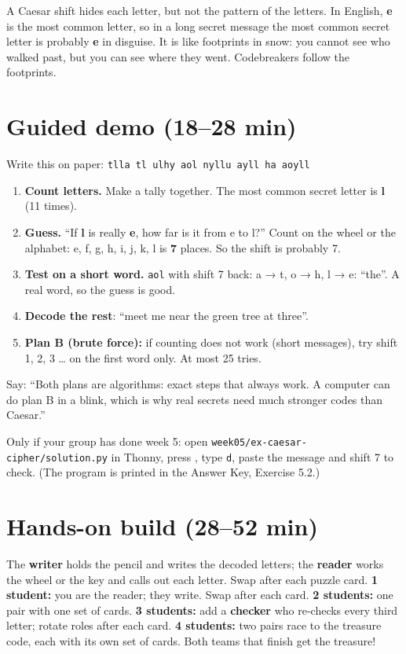 \begin{analogy}
A Caesar shift hides each letter, but not the pattern of the letters. In English, \textbf{e} is the most common letter, so in a long secret message
the most common secret letter is probably \textbf{e} in disguise. It is like footprints in snow: you cannot see who walked past,
but you can see where they went. Codebreakers follow the footprints.
\end{analogy}

\section{Guided demo (18--28 min)}
\begin{workedexample}
Write this on paper: \texttt{tlla tl ulhy aol nyllu ayll ha aoyll}
\begin{enumerate}[leftmargin=1.4em]
  \item \textbf{Count letters.} Make a tally together. The most common secret letter is \textbf{l} (11 times).
  \item \textbf{Guess.} \enquote{If \textbf{l} is really \textbf{e}, how far is it from e to l?} Count on the wheel or the alphabet: e, f, g, h, i, j, k, l is \textbf{7} places. So the shift is probably 7.
  \item \textbf{Test on a short word.} \texttt{aol} with shift 7 back: a → t, o → h, l → e: \enquote{the}. A real word, so the guess is good.
  \item \textbf{Decode the rest}: \enquote{meet me near the green tree at three}.
  \item \textbf{Plan B (brute force):} if counting does not work (short messages), try shift 1, 2, 3 \ldots{} on the first word only. At most 25 tries.
\end{enumerate}
Say: \enquote{Both plans are algorithms: exact steps that always work. A computer can do plan B in a blink, which is why real secrets need much stronger codes than Caesar.}
\end{workedexample}
Only if your group has done week 5: open \texttt{week05/ex-caesar-cipher/solution.py} in Thonny, press , type \texttt{d}, paste the message
and shift 7 to check. (The program is printed in the Answer Key, Exercise 5.2.)

\section{Hands-on build (28--52 min)}
\begin{pairroles}
The \textbf{writer} holds the pencil and writes the decoded letters; the \textbf{reader} works the wheel or the key and calls out each letter.
Swap after each puzzle card.
\textbf{1 student:} you are the reader; they write. Swap after each card.
\textbf{2 students:} one pair with one set of cards.
\textbf{3 students:} add a \textbf{checker} who re-checks every third letter; rotate roles after each card.
\textbf{4 students:} two pairs race to the treasure code, each with its own set of cards. Both teams that finish get the treasure!
\end{pairroles}

